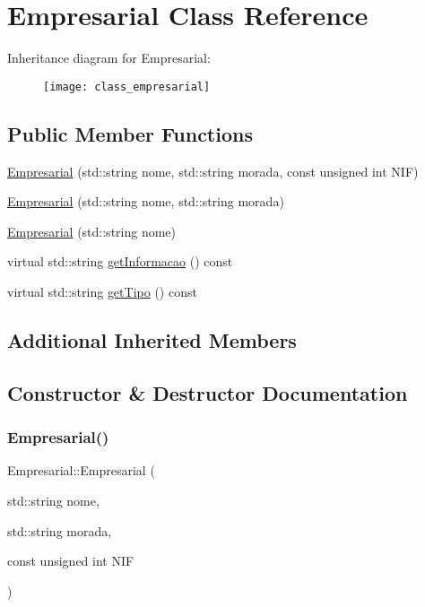 \hypertarget{class_empresarial}{}\section{Empresarial Class Reference}
\label{class_empresarial}
Inheritance diagram for Empresarial\+:\begin{figure}[H]
\begin{center}
\leavevmode
\texttt{[image: class\_empresarial]}
\end{center}
\end{figure}
\subsection*{Public Member Functions}
\begin{DoxyCompactItemize}
\item 
\hyperlink{class_empresarial_abc2cfe8386b61448ab193977024fe821}{Empresarial} (std\+::string nome, std\+::string morada, const unsigned int N\+IF)
\item 
\hyperlink{class_empresarial_a8f89fe5f36da7bf48548ff67b27e547f}{Empresarial} (std\+::string nome, std\+::string morada)
\item 
\hyperlink{class_empresarial_a1a87eb7f12020af2c8ee8e942f3b8344}{Empresarial} (std\+::string nome)
\item 
virtual std\+::string \hyperlink{class_empresarial_a28090b6b3db16b6b7ba03d6308c2c309}{get\+Informacao} () const
\item 
virtual std\+::string \hyperlink{class_empresarial_a3d5d89f5a446fdcca0955d289592edaf}{get\+Tipo} () const
\end{DoxyCompactItemize}
\subsection*{Additional Inherited Members}


\subsection{Constructor \& Destructor Documentation}
\mbox{\label{class_empresarial_abc2cfe8386b61448ab193977024fe821}} 
\subsubsection{\texorpdfstring{Empresarial()}{Empresarial()}\hspace{0.1cm}{\footnotesize\ttfamily [1/3]}}
{\footnotesize\ttfamily Empresarial\+::\+Empresarial (\begin{DoxyParamCaption}\item[{std\+::string}]{nome,  }\item[{std\+::string}]{morada,  }\item[{const unsigned int}]{N\+IF }\end{DoxyParamCaption})}

